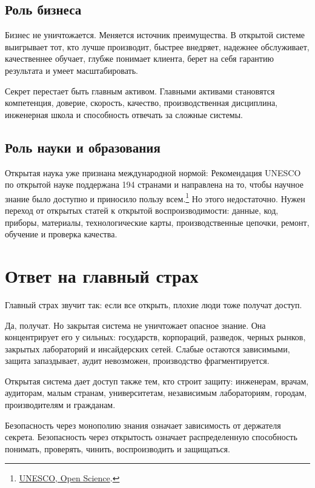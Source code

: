 \documentclass[11pt,a4paper]{article}
\begin{document}
\subsection{Роль бизнеса}

Бизнес не уничтожается. Меняется источник преимущества. В открытой системе выигрывает тот, кто лучше производит, быстрее внедряет, надежнее обслуживает, качественнее обучает, глубже понимает клиента, берет на себя гарантию результата и умеет масштабировать.

Секрет перестает быть главным активом. Главными активами становятся компетенция, доверие, скорость, качество, производственная дисциплина, инженерная школа и способность отвечать за сложные системы.

\subsection{Роль науки и образования}

Открытая наука уже признана международной нормой: Рекомендация UNESCO по открытой науке поддержана 194 странами и направлена на то, чтобы научное знание было доступно и приносило пользу всем.\footnote{\href{https://www.unesco.org/en/open-science}{UNESCO, Open Science}.} Но этого недостаточно. Нужен переход от открытых статей к открытой воспроизводимости: данные, код, приборы, материалы, технологические карты, производственные цепочки, ремонт, обучение и проверка качества.

\section{Ответ на главный страх}

Главный страх звучит так: если все открыть, плохие люди тоже получат доступ.

Да, получат. Но закрытая система не уничтожает опасное знание. Она концентрирует его у сильных: государств, корпораций, разведок, черных рынков, закрытых лабораторий и инсайдерских сетей. Слабые остаются зависимыми, защита запаздывает, аудит невозможен, производство фрагментируется.

Открытая система дает доступ также тем, кто строит защиту: инженерам, врачам, аудиторам, малым странам, университетам, независимым лабораториям, городам, производителям и гражданам.

Безопасность через монополию знания означает зависимость от держателя секрета. Безопасность через открытость означает распределенную способность понимать, проверять, чинить, воспроизводить и защищаться.
\end{document}
